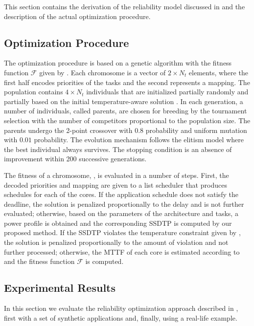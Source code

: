 This section contains the derivation of the reliability model discussed in
 and the description of the actual optimization
procedure.

\subsection{Optimization Procedure}

The optimization procedure is based on a genetic algorithm \cite{schmitz2004}
with the fitness function $\mathcal{F}$ given by . Each
chromosome is a vector of $2 \times N_t$ elements, where the first half encodes
priorities of the tasks and the second represents a mapping. The population
contains $4 \times N_t$ individuals that are initialized partially randomly and
partially based on the initial temperature-aware solution \cite{xie2006}. In
each generation, a number of individuals, called parents, are chosen for
breeding by the tournament selection with the number of competitors proportional
to the population size. The parents undergo the 2-point crossover with $0.8$
probability and uniform mutation with $0.01$ probability. The evolution
mechanism follows the elitism model where the best individual always survives.
The stopping condition is an absence of improvement within 200 successive
generations.

The fitness of a chromosome, , is evaluated in a number
of steps. First, the decoded priorities and mapping are given to a list
scheduler that produces schedules for each of the cores. If the application
schedule does not satisfy the deadline, the solution is penalized proportionally
to the delay and is not further evaluated; otherwise, based on the parameters of
the architecture and tasks, a power profile is obtained and the corresponding
SSDTP is computed by our proposed method. If the SSDTP violates the temperature
constraint given by , the solution is penalized proportionally to
the amount of violation and not further processed; otherwise, the MTTF of each
core is estimated according to  and the fitness
function $\mathcal{F}$ is computed.

\subsection{Experimental Results}

In this section we evaluate the reliability optimization approach described in
, first with a set of synthetic applications and,
finally, using a real-life example.

